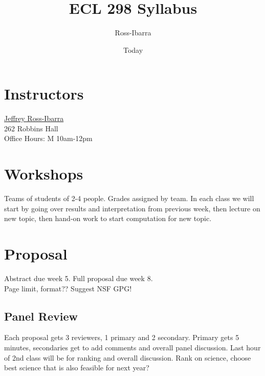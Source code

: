 \documentclass[]{article}
\begin{document}
\title{ECL 298 Syllabus}
\author{Ross-Ibarra}
\date{Today}
\maketitle

\section*{Instructors}

\href{mailto:rossibarra@ucdavis.edu}{Jeffrey Ross-Ibarra}\\
262 Robbins Hall\\
Office Hours: M 10am-12pm

\section*{Workshops}

Teams of students of 2-4 people. Grades assigned by team. In each class we will start by going over results and interpretation from previous week, then lecture on new topic, then hand-on work to start computation for new topic.

\section*{Proposal}
Abstract due week 5. Full proposal due week 8. \\
Page limit, format??  Suggest NSF GPG!

\subsection*{Panel Review}
Each proposal gets 3 reviewers, 1 primary and 2 secondary. Primary gets 5 minutes, secondaries get to add comments and overall panel discussion. Last hour of 2nd class will be for ranking and overall discussion. Rank on science, choose best science that is also feasible for next year?
\end{document}
